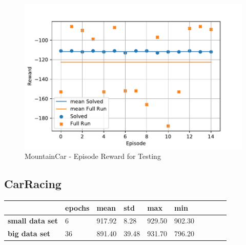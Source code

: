 \documentclass[
        a4paper,
        10pt,
        parskip = full,    %
    ]{scrartcl}
\begin{document}
\begin{figure}[H]
  \begin{center}
    \includegraphics{./images/MountainCar-v0/tb_test_reward.pdf}
    \caption{MountainCar - Episode Reward for Testing}
    \label{MountainCarTestReward}
  \end{center}
\end{figure}






\subsection{CarRacing}

\begin{center}
    \begin{tabular}{ | l | l | l |l| l| l| l| l| l| l|}
    \hline
                            & \textbf{epochs} & \textbf{mean} & \textbf{std} & \textbf{max} & \textbf{min}  \\ \hline
    \textbf{small data set} & 6   & 917.92      & 8.28      &   929.50    & 902.30  \\ \hline
    \textbf{big data set}  & 36 & 891.40 & 39.48 & 931.70  & 796.20  \\ \hline
    \end{tabular}
\end{center}
\end{document}
